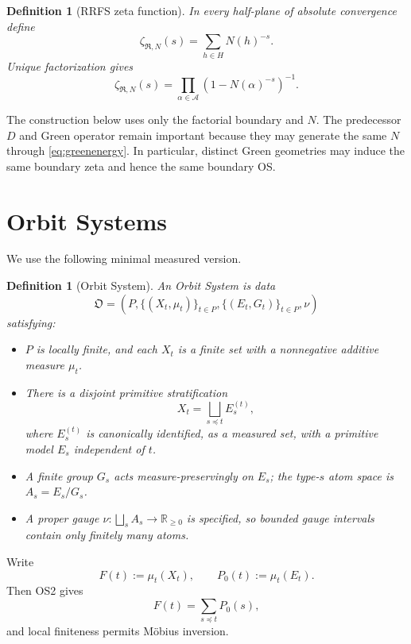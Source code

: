 \documentclass[11pt]{article}
\newtheorem{definition}[theorem]{Definition}
\newcommand{\RR}{\mathbb R}
\newcommand{\cA}{\mathcal A}
\newcommand{\cR}{\mathfrak R}
\newcommand{\cO}{\mathfrak O}
\begin{document}
\begin{definition}[RRFS zeta function]
In every half-plane of absolute convergence define
\[
\zeta_{\cR,N}(s)=\sum_{h\in H}N(h)^{-s}.
\]
Unique factorization gives
\begin{equation}\label{eq:euler}
\boxed{
\zeta_{\cR,N}(s)
=\prod_{\alpha\in\cA}
\left(1-N(\alpha)^{-s}\right)^{-1}.}
\end{equation}
\end{definition}

The construction below uses only the factorial boundary and $N$. The predecessor $D$ and Green operator remain important because they may generate the same $N$ through \eqref{eq:greenenergy}. In particular, distinct Green geometries may induce the same boundary zeta and hence the same boundary OS.

\section{Orbit Systems}

We use the following minimal measured version.

\begin{definition}[Orbit System]
An Orbit System is data
\[
\cO=(P,\{(X_t,\mu_t)\}_{t\in P},\{(E_t,G_t)\}_{t\in P},\nu)
\]
satisfying:
\begin{itemize}
\item[\textbf{OS1.}] $P$ is locally finite, and each $X_t$ is a finite set with a nonnegative additive measure $\mu_t$.
\item[\textbf{OS2.}] There is a disjoint primitive stratification
\[
X_t=\bigsqcup_{s\preceq t}E_s^{(t)},
\]
where $E_s^{(t)}$ is canonically identified, as a measured set, with a primitive model $E_s$ independent of $t$.
\item[\textbf{OS3.}] A finite group $G_s$ acts measure-preservingly on $E_s$; the type-$s$ atom space is $A_s=E_s/G_s$.
\item[\textbf{OS4.}] A proper gauge $\nu:\bigsqcup_s A_s\to\RR_{\ge0}$ is specified, so bounded gauge intervals contain only finitely many atoms.
\end{itemize}
\end{definition}

Write
\[
F(t):=\mu_t(X_t),\qquad P_0(t):=\mu_t(E_t).
\]
Then OS2 gives
\begin{equation}\label{eq:master}
F(t)=\sum_{s\preceq t}P_0(s),
\end{equation}
and local finiteness permits M\"obius inversion.
\end{document}
